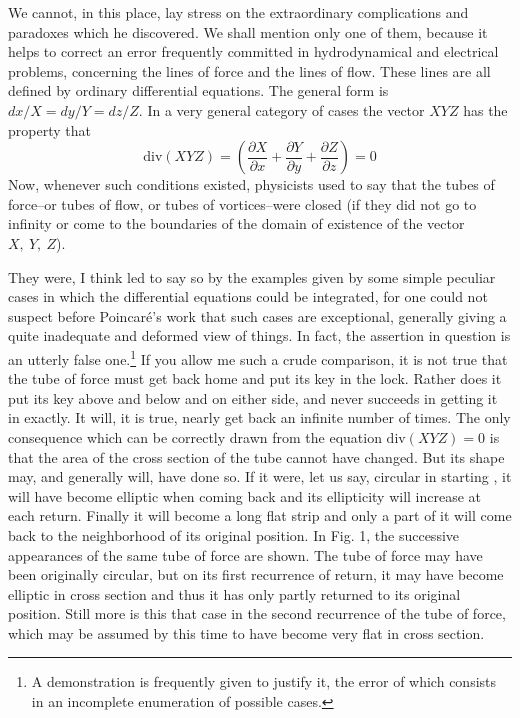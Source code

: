 \documentclass[12pt,oneside]{book}
\begin{document}
We cannot, in this place, lay stress on the extraordinary complications and
paradoxes which he discovered. We shall mention only one of them, because it
helps to correct an error frequently committed in hydrodynamical and electrical
problems, concerning the lines of force and the lines of flow. These lines are
all defined by ordinary differential equations. The general form is
$dx/X=dy/Y=dz/Z$. In a very general category of cases the vector $XYZ$ has the
property that
\begin{equation*}
    \text{div}(XYZ)=\left(\frac{\partial X}{\partial x}+\frac{\partial Y}{\partial y}+\frac{\partial Z}{\partial z}\right)=0
\end{equation*}
Now, whenever such conditions existed, physicists used to say that the tubes of
force--or tubes of flow, or tubes of vortices--were closed (if they did not go
to infinity or come to the boundaries of the domain of existence of the vector
$X,\ Y,\ Z$). \par

They were, I think led to say so by the examples given by some simple peculiar
cases in which the differential equations could be integrated, for one could not
suspect before Poincar\'e's work that such cases are exceptional, generally
giving a quite inadequate and deformed view of things. In fact, the assertion in
question is an utterly false one.\footnote{A demonstration is frequently given
to justify it, the error of which consists in an incomplete enumeration of
possible cases.} If you allow me such a crude comparison, it is not true that
the tube of force must get back home and put its key in the lock. Rather does it
put its key above and below and on either side, and never succeeds in getting it
in exactly. It will, it is true, nearly get back an infinite number of times.
The only consequence which can be correctly drawn from the equation
$\text{div}(XYZ)=0$ is that the area of the cross section of the tube cannot
have changed. But its shape may, and generally will, have done so. If it were,
let us say, circular in starting , it will have become elliptic when coming back
and its ellipticity will increase at each return. Finally it will become a long
flat strip and only a part of it will come back to the neighborhood of its
original position. In Fig. 1, the successive appearances of the same tube of
force are shown. The tube of force may have been originally circular, but on its
first recurrence of return, it may have become elliptic in cross section and
thus it has only partly returned to its original position. Still more is this
that case in the second recurrence of the tube of force, which may be assumed by
this time to have become very flat in cross section.
\end{document}

